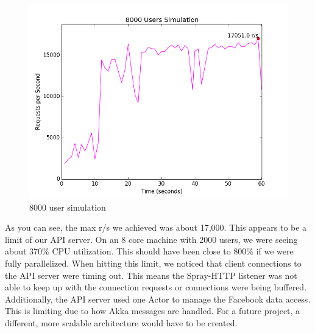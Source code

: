 \documentclass{article}
\begin{document}
\begin{figure}[H]
  \centering
  \includegraphics[scale=0.5]{diagrams/rps-8000.png}
  \caption{8000 user simulation}
\end{figure}

As you can see, the max r/s we achieved was about 17,000. This appears to be a limit of our API server. On an 8 core machine with 2000 users, we were seeing about 370\% CPU utilization. This should have been close to 800\% if we were fully parallelized. When hitting this limit, we noticed that client connections to the API server were timing out. This means the Spray-HTTP listener was not able to keep up with the connection requests or connections were being buffered. Additionally, the API server used one Actor to manage the Facebook data access. This is limiting due to how Akka messages are handled. For a future project, a different, more scalable architecture would have to be created.
\end{document}
